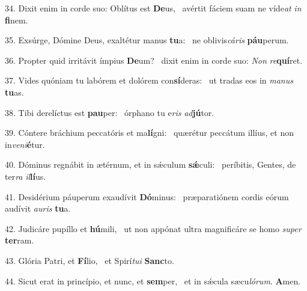 34. Dixit enim in corde suo: Oblítus est \textbf{De}us, \ast\  avértit fáciem suam ne víde\textit{at} \textit{in} \textbf{fi}nem.\

35. Exsúrge, Dómine Deus, exaltétur manus \textbf{tu}a: \ast\  ne oblivis\textit{cá}\textit{ris} \textbf{páu}perum.\

36. Propter quid irritávit ímpius \textbf{De}um? \ast\  dixit enim in corde suo: \textit{Non} \textit{re}\textbf{quí}ret.\

37. Vides quóniam tu labórem et dolórem con\textbf{sí}deras: \ast\  ut tradas eos in \textit{ma}\textit{nus} \textbf{tu}as.\

38. Tibi derelíctus est \textbf{pau}per: \ast\  órphano tu e\textit{ris} \textit{ad}\textbf{jú}tor.\

39. Cóntere bráchium peccatóris et ma\textbf{lí}gni: \ast\  quærétur peccátum illíus, et non in\textit{ve}\textit{ni}\textbf{é}tur.\

40. Dóminus regnábit in ætérnum, et in sǽculum \textbf{sǽ}culi: \ast\  períbitis, Gentes, de ter\textit{ra} \textit{il}\textbf{lí}us.\

41. Desidérium páuperum exaudívit \textbf{Dó}minus: \ast\  præparatiónem cordis eórum audívit \textit{au}\textit{ris} \textbf{tu}a.\

42. Judicáre pupíllo et \textbf{hú}mili, \ast\  ut non appónat ultra magnificáre se homo \textit{su}\textit{per} \textbf{ter}ram.\

43. Glória Patri, et \textbf{Fí}lio, \ast\  et Spirí\textit{tu}\textit{i} \textbf{Sanc}to.\

44. Sicut erat in princípio, et nunc, et \textbf{sem}per, \ast\  et in sǽcula sæcu\textit{ló}\textit{rum}. \textbf{A}men.\

